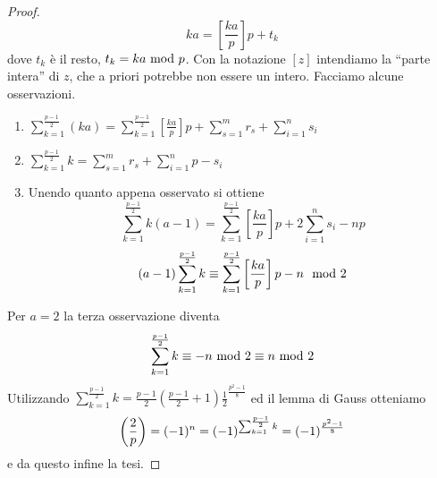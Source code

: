 \begin{proof}
	\begin{equation*}
	ka=\left[\frac{ka}{p}\right]p+t_k
	\end{equation*}
	dove $t_k$ è il resto, $t_k=ka\ \mathrm{mod}\ p$. Con la notazione $\left[z\right]$ intendiamo la \enquote{parte intera} di $z$, che a priori potrebbe non essere un intero. Facciamo alcune osservazioni.
	\begin{enumerate}
		\item $\displaystyle \sum_{k=1}^{\frac{p-1}{2}}(ka)=\sum_{k=1}^{\frac{p-1}{2}}\left[\frac{ka}{p}\right]p+\sum_{s=1}^{m}r_s+\sum_{i=1}^{n}s_i$
		\item $\displaystyle\sum_{k=1}^{\frac{p-1}{2}}k=\sum_{s=1}^{m}r_s+\sum_{i=1}^{n}p-s_i $ 
		\item Unendo quanto appena osservato si ottiene
		\begin{equation*}
		\sum_{k=1}^{\frac{p-1}{2}}k(a-1)=\sum_{k=1}^{\frac{p-1}{2}}\left[\frac{ka}{p}\right]p+2\sum_{i=1}^{n}s_i-np
		\end{equation*}
		\begin{equation*}
		(a-1)\sum_{k=1}^{\frac{p-1}{2}}k\equiv\sum_{k=1}^{\frac{p-1}{2}}\left[\frac{ka}{p}\right]p-n \ \ \mathrm{mod}\ 2
		\end{equation*}
	\end{enumerate}
	Per $a=2$ la terza osservazione diventa 
	\begin{equation*}
	\sum_{k=1}^{\frac{p-1}{2}}k\equiv-n\ \mathrm{mod}\ 2\equiv n\ \mathrm{mod}\ 2
	\end{equation*}
	Utilizzando $\sum_{k=1}^{\frac{p-1}{2}}k=\frac{p-1}{2}\left(\frac{p-1}{2}+1\right)\frac{1}{2}^\frac{p^2-1}{8} $ ed il lemma di Gauss otteniamo
	\begin{equation*}
	\left(\frac{2}{p}\right)=(-1)^n=(-1)^{\sum_{k=1}^{\frac{p-1}{2}}k}=(-1)^{\frac{p^2-1}{8}}
	\end{equation*}
	e da questo infine la tesi.
\end{proof}
